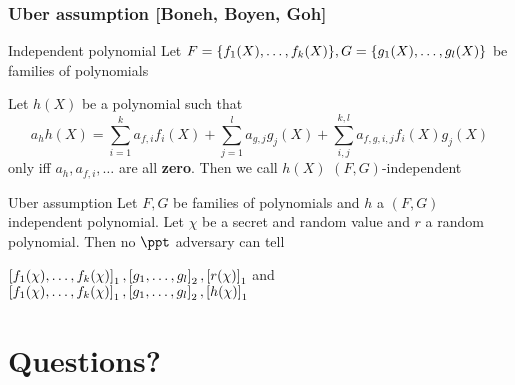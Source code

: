 \documentclass[aspectratio=169]{beamer}
\renewcommand{\emph}[1]{\textbf{#1}}
\begin{document}
\begin{frame}
  \frametitle{Uber assumption [Boneh, Boyen, Goh]}
  \begin{block}{Independent polynomial}
    Let $F = \{f_1(X), \ldots, f_k(X)\}, G = \{g_1(X), \ldots, g_l(X)\}$ be
    families of polynomials

    Let $h(X)$ be a polynomial such that
    \[
      a_h h(X) = \sum_{i = 1}^k a_{f, i} f_i (X) + \sum_{j = 1}^l a_{g, j} g_j
      (X) + \sum_{i, j}^{k, l} a_{f, g, i, j} f_i (X) g_j (X) 
    \]
    only iff $a_h, a_{f, i}, \ldots $ are all \emph{zero}. Then we call $h(X)$
    $(F, G)$-independent
  \end{block}\pause

  \begin{block}{Uber assumption}
    Let $F, G$ be families of polynomials and $h$ a $(F, G)$ independent
    polynomial. Let $\chi$ be a secret and random value and $r$ a random
    polynomial. Then no $\ppt$
    adversary can tell
    \begin{center}
     $\left[f_1(\chi), \ldots, f_k(\chi)\right]_{1}, \left[g_1, \ldots, g_l\right]_{2},
     \left[r(\chi)\right]_{1}$ and 
     $\left[f_1(\chi), \ldots, f_k(\chi)\right]_{1}, \left[g_1, \ldots, g_l\right]_{2},
     \left[h(\chi)\right]_{1}$
     \end{center}
    \end{block}
\end{frame}

\section{Questions?}
\end{document}
